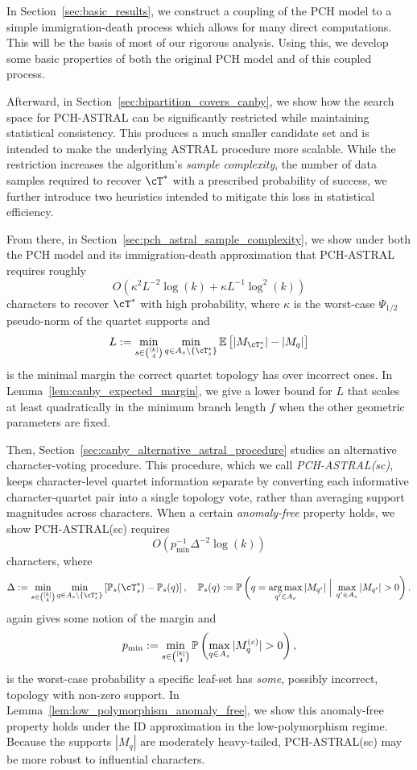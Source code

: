 In Section~\ref{sec:basic_results}, we construct a coupling of the PCH model to a simple immigration-death
process which allows for many direct computations. This will be the basis of most of our rigorous analysis.
Using this, we develop some basic properties of both the original PCH model and of this coupled process.


Afterward, in Section~\ref{sec:bipartition_covers_canby}, we show how the search space for PCH-ASTRAL can be
significantly restricted while maintaining statistical consistency. This produces a much smaller candidate set
and is intended to make the underlying ASTRAL procedure more scalable. While the
restriction increases the algorithm's \textit{sample complexity}, the number of data samples required to recover
$\cT^*$ with a prescribed probability of success, we further introduce two heuristics intended to mitigate this
loss in statistical efficiency.

From there, in Section~\ref{sec:pch_astral_sample_complexity}, we show under both the PCH model and its immigration-death approximation that
PCH-ASTRAL requires roughly
%
    \[O\left(\kappa^2L^{-2}\log(k)+\kappa L^{-1}\log^2(k)\right)\]
%
\noindent characters to recover $\cT^*$ with high probability, where
$\kappa$ is the worst-case $\Psi_{1/2}$ pseudo-norm of the quartet supports and
%
    \[L := \min_{s \in {[k] \choose 4}} \min_{q \in A_s \setminus \{\cT_s^*\}} \E \left[|M_{\cT_s^*}| - |M_q|\right]\]
%
is the minimal margin the correct quartet topology has over incorrect ones. In Lemma~\ref{lem:canby_expected_margin}, we
give a lower bound for $L$ that scales at least quadratically in the minimum branch length $f$
when the other geometric parameters are fixed.

Then, Section~\ref{sec:canby_alternative_astral_procedure} studies an alternative character-voting
procedure. This procedure, which we call \textit{PCH-ASTRAL(sc)}, keeps character-level quartet information
separate by converting each informative character-quartet pair into a single topology vote, rather than averaging
 support magnitudes across characters. When a certain \emph{anomaly-free} property holds, we show PCH-ASTRAL(sc) requires
    \[O(p_{\min}^{-1}\Delta^{-2}\log(k))\]
 characters, where
%
    \[\Delta := \min_{s \in {[k] \choose 4}} \min_{q \in A_s \setminus \{\cT_s^*\}} \left[\P_s(\cT_s^*) - \P_s(q)\right], \quad \P_s(q) := \P\left(q = \argmax_{q' \in A_s} |M_{q'}| \; \Big\vert \; \max_{q' \in A_s} |M_{q'}| > 0\right).\]
%
again gives some notion of the margin and
%
    \[p_{\min} := \min_{s \in {[k] \choose 4}} \P\left(\max_{q \in A_s} |M_q^{(c)}| > 0\right),\]
%
\noindent is the worst-case probability a specific leaf-set has \emph{some}, possibly incorrect, topology
with non-zero support. In Lemma~\ref{lem:low_polymorphism_anomaly_free}, we show this anomaly-free property holds
under the ID approximation in the low-polymorphism regime. Because the supports $|M_q|$
are moderately heavy-tailed, PCH-ASTRAL(sc) may be more robust to influential characters.




